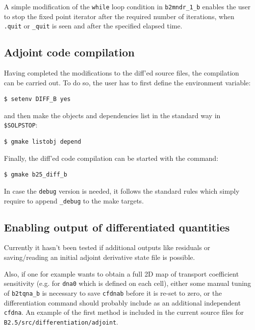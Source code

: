 A simple modification of the {\tt while} loop condition in {\tt b2mndr\_1\_b} enables the user to stop the fixed point iterator after the required number of iterations, when {\tt .quit} or {\tt \_quit} is seen and after the specified elapsed time.

\subsection{Adjoint code compilation}

Having completed the modifications to the diff'ed source files, the compilation can be carried out. To do so, the user has to first define the environment variable:
\begin{verbatim}
$ setenv DIFF_B yes
\end{verbatim}
and then make the objects and dependencies list in the standard way in {\tt \$SOLPSTOP}:
\begin{verbatim}
$ gmake listobj depend
\end{verbatim}
Finally, the diff'ed code compilation can be started with the command:
\begin{verbatim}
$ gmake b25_diff_b
\end{verbatim}

In case the {\tt debug} version is needed, it follows the standard \SOLPSITER rules which simply require to append {\tt \_debug} to the make targets.

\subsection{Enabling output of differentiated quantities}

Currently it hasn't been tested if additional outputs like residuals or saving/reading an initial adjoint derivative state file is possible.

Also, if one for example wants to obtain a full 2D map of transport coefficient sensitivity (e.g. for {\tt dna0} which is defined on each cell), either some manual tuning of {\tt b2tqna\_b} is necessary to save {\tt cfdnab} before it is re-set to zero, or the differentiation command should probably include as an additional independent {\tt cfdna}. An example of the first method is included in the current source files for {\tt B2.5/src/differentiation/adjoint}.

